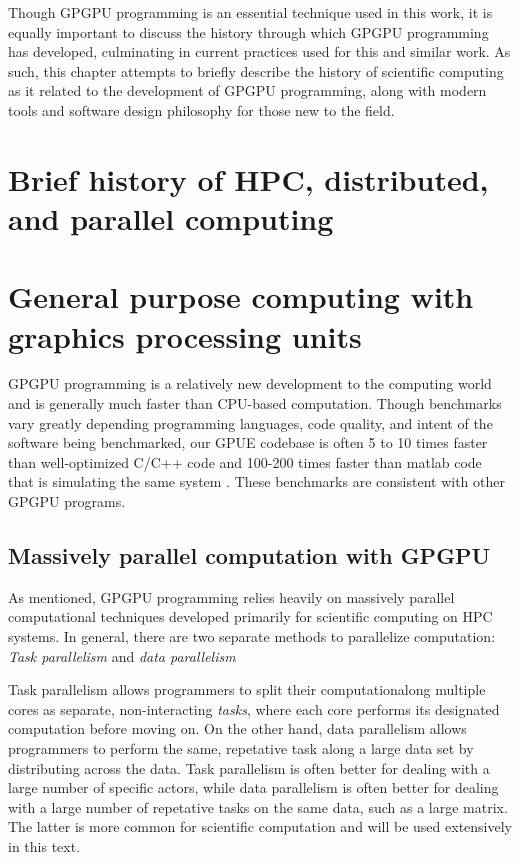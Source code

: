 Though GPGPU programming is an essential technique used in this work, it is equally important to discuss the history through which GPGPU programming has developed, culminating in current practices used for this and similar work.
As such, this chapter attempts to briefly describe the history of scientific computing as it related to the development of GPGPU programming, along with modern tools and software design philosophy for those new to the field.

\section{Brief history of HPC, distributed, and parallel computing}

\section{General purpose computing with graphics processing units}

GPGPU programming is a relatively new development to the computing world and is generally much faster than CPU-based computation.
Though benchmarks vary greatly depending programming languages, code quality, and intent of the software being benchmarked, our GPUE codebase is often 5 to 10 times faster than well-optimized C/C++ code and 100-200 times faster than matlab code that is simulating the same system .
These benchmarks are consistent with other GPGPU programs.

\subsection{Massively parallel computation with GPGPU}

As mentioned, GPGPU programming relies heavily on massively parallel computational techniques developed primarily for scientific computing on HPC systems.
In general, there are two separate methods to parallelize computation: \textit{Task parallelism} and \textit{data parallelism}

Task parallelism allows programmers to split their computationalong multiple cores as separate, non-interacting \textit{tasks}, where each core performs its designated computation before moving on.
On the other hand, data parallelism allows programmers to perform the same, repetative task along a large data set by distributing across the data.
Task parallelism is often better for dealing with a large number of specific actors, while data parallelism is often better for dealing with a large number of repetative tasks on the same data, such as a large matrix.
The latter is more common for scientific computation and will be used extensively in this text.

